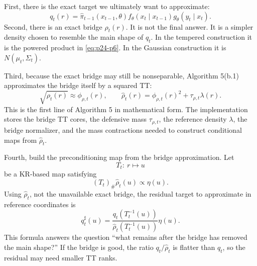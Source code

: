 \documentclass[11pt]{article}
\numberwithin{equation}{section}
\begin{document}
First, there is the exact target we ultimately want to approximate:
\begin{equation}
    q_t(r)
    =
    \widehat\pi_{t-1}(x_{t-1},\theta)
    f_\theta(x_t\mid x_{t-1})
    g_\theta(y_t\mid x_t).
    \label{eq:p24-p7a}
\end{equation}
Second, there is an exact bridge \(\rho_t(r)\).  It is not the final answer.
It is a simpler density chosen to resemble the main shape of \(q_t\).  In the
tempered construction it is the powered product in \eqref{eq:p24-p6}.  In the Gaussian
construction it is \(N(\mu_t,\Sigma_t)\).

Third, because the exact bridge may still be nonseparable, Algorithm 5(b.1)
approximates the bridge itself by a squared TT:
\begin{equation}
    \sqrt{\rho_t(r)}\approx \phi_{\rho,t}(r),
    \qquad
    \widehat\rho_t(r)
    =
    \phi_{\rho,t}(r)^2+\tau_{\rho,t}\lambda(r).
    \label{eq:p24-p7b}
\end{equation}
This is the first line of Algorithm 5 in mathematical form.  The implementation
stores the bridge TT cores, the defensive mass \(\tau_{\rho,t}\), the reference
density \(\lambda\), the bridge normalizer, and the mass contractions needed to
construct conditional maps from \(\widehat\rho_t\).

Fourth, build the preconditioning map from the bridge approximation.  Let
\begin{equation}
    T_t:\ r\mapsto u
    \label{eq:p24-p7c}
\end{equation}
be a KR-based map satisfying
\begin{equation}
    (T_t)_\#\widehat\rho_t(u)\propto \eta(u).
    \label{eq:p24-p7d}
\end{equation}
Using \(\widehat\rho_t\), not the unavailable exact bridge, the residual target
to approximate in reference coordinates is
\begin{equation}
    q_t^\sharp(u)
    =
    \frac{q_t(T_t^{-1}(u))}
    {\widehat\rho_t(T_t^{-1}(u))}
    \eta(u).
    \label{eq:p24-p7e}
\end{equation}
This formula answers the question ``what remains after the bridge has removed
the main shape?''  If the bridge is good, the ratio \(q_t/\widehat\rho_t\) is
flatter than \(q_t\), so the residual may need smaller TT ranks.
\end{document}
